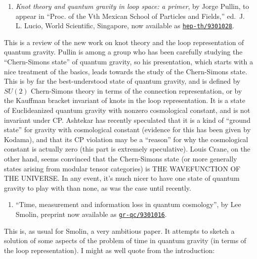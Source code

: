 \documentclass{article}
\def\tightlist{}
\begin{document}
\begin{enumerate}
\def\labelenumi{\arabic{enumi})}
\setcounter{enumi}{1}
\tightlist
\item
  \emph{Knot theory and quantum gravity in loop space: a primer}, by
  Jorge Pullin, to appear in ``Proc. of the Vth Mexican School of
  Particles and Fields,'' ed.~J. L. Lucio, World Scientific, Singapore,
  now available as
  \href{http://xxx.lanl.gov/abs/hep-th/9301028}{\texttt{hep-th/9301028}}.
\end{enumerate}

This is a review of the new work on knot theory and the loop
representation of quantum gravity. Pullin is among a group who has been
carefully studying the ``Chern-Simons state'' of quantum gravity, so his
presentation, which starts with a nice treatment of the basics, leads
towards the study of the Chern-Simons state. This is by far the
best-understood state of quantum gravity, and is defined by \(SU(2)\)
Chern-Simons theory in terms of the connection representation, or by the
Kauffman bracket invariant of knots in the loop representation. It is a
state of Euclideanized quantum gravity with nonzero cosmological
constant, and is not invariant under CP. Ashtekar has recently
speculated that it is a kind of ``ground state'' for gravity with
cosmological constant (evidence for this has been given by Kodama), and
that its CP violation may be a ``reason'' for why the cosmological
constant is actually zero (this part is extremely speculative). Louis
Crane, on the other hand, seems convinced that the Chern-Simons state
(or more generally states arising from modular tensor categories) is THE
WAVEFUNCTION OF THE UNIVERSE. In any event, it's much nicer to have one
state of quantum gravity to play with than none, as was the case until
recently.

\begin{enumerate}
\def\labelenumi{\arabic{enumi})}
\setcounter{enumi}{2}
\tightlist
\item
  ``Time, measurement and information loss in quantum cosmology'', by
  Lee Smolin, preprint now available as
  \href{http://xxx.lanl.gov/abs/gr-qc/9301016}{\texttt{gr-qc/9301016}}.
\end{enumerate}

This is, as usual for Smolin, a very ambitious paper. It attempts to
sketch a solution of some aspects of the problem of time in quantum
gravity (in terms of the loop representation). I might as well quote
from the introduction:
\end{document}

